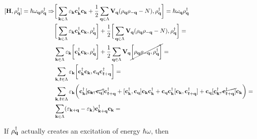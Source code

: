 \begin{equation} 
\begin{split}
    [{\bf H}, \rho_{\bf q}^\dagger] = \hbar \omega_{{\bf q}} \rho_{{\bf q}}^\dagger  \Rightarrow & \bigg[\sum_{{\bf k} \in \Lambda} \varepsilon_{{\bf k}} {\bf c}_{{\bf k}}^\dagger {\bf c}_{{\bf k}} + \frac{1}{2} \sum_{{\bf q} \in \Lambda} {\bf V}_{{\bf q}} (\rho_{{\bf q}} \rho_{-{\bf q}} - N), \rho_{\bf q}^\dagger \bigg] = \hbar \omega_{{\bf q}} \rho_{{\bf q}}^\dagger \\
    & \bigg[\sum_{{\bf k} \in \Lambda} \varepsilon_{{\bf k}} {\bf c}_{{\bf k}}^\dagger {\bf c}_{{\bf k}}, \rho_{\bf q}^\dagger\bigg] + \frac{1}{2} \bigg[\sum_{{\bf q} \in \Lambda} {\bf V}_{{\bf q}} (\rho_{{\bf q}} \rho_{-{\bf q}} - N), \rho_{\bf q}^\dagger \bigg] = \\
    & \sum_{{\bf k} \in \Lambda} \varepsilon_{{\bf k}} \bigg[ {\bf c}_{{\bf k}}^\dagger {\bf c}_{{\bf k}}, \rho_{\bf q}^\dagger\bigg] + \frac{1}{2} \sum_{{\bf q} \in \Lambda} {\bf V}_{{\bf q}} \cancel{\bigg[\rho_{{\bf q}} \rho_{-{\bf q}}, \rho_{\bf q}^\dagger\bigg]} = \\
    & \sum_{{\bf k}, \mathfrak{k} \in \Lambda} \varepsilon_{{\bf k}} \bigg[ {\bf c}_{{\bf k}}^\dagger {\bf c}_{{\bf k}}, {\bf c}_{{\bf q}} {\bf c}_{{\bf \mathfrak{k} + q}}^\dagger \bigg] =  \\
    &\sum_{{\bf k}, \mathfrak{k} \in \Lambda} \varepsilon_{{\bf k}} \bigg({\bf c}_{{\bf k}}^\dagger \cancel{[{\bf c}_{{\bf k}}, {\bf c}_{{\bf q}}]} {\bf c}_{{\bf \mathfrak{k} + q}}^\dagger + [{\bf c}_{{\bf k}}^\dagger, {\bf c}_{{\bf q}}] {\bf c}_{{\bf k}} {\bf c}_{{\bf k}}^\dagger + {\bf c}_{{\bf q}} {\bf c}_{{\bf k}}^\dagger [{\bf c}_{{\bf k}}, {\bf c}_{{\bf \mathfrak{k} + q}}^\dagger] + {\bf c}_{{\bf q}} \cancel{[{\bf c}_{{\bf k}}^\dagger, {\bf c}_{{\bf \mathfrak{k} + q}}^\dagger]} {\bf c}_{{\bf k}} \bigg) = \\
    & \sum_{{\bf k} \in \Lambda} (\varepsilon_{{\bf k + q}} - \varepsilon_{{\bf k}}) {\bf c}_{{\bf {\bf k} + q}}^\dagger {\bf c}_{{\bf k}} = 
\end{split}
\end{equation}

If $\rho_{{\bf q}}^\dagger$ actually creates an excitation of energy $\hbar \omega$, then 

